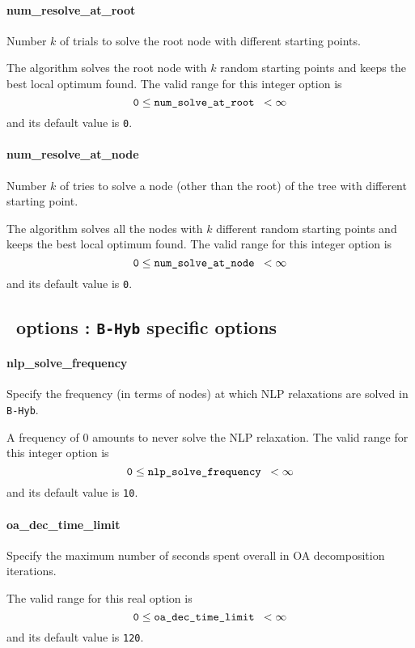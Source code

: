 \paragraph{num\_resolve\_at\_root}
Number $k$ of trials to solve the root node with different starting points.

 The algorithm solves the root node with $k$
random starting points and keeps the best
local optimum found. The valid range for this integer option is
$${\tt 0} \le \hbox{\tt num\_solve\_at\_root } <  \infty $$
and its default value is {\tt 0}.


\paragraph{num\_resolve\_at\_node}
Number $k$ of tries to solve a node (other than the root) of the tree with different starting point.

 The algorithm solves all the nodes with $k$
different random starting points and keeps
the best local optimum found. The valid range for this integer option is
$${\tt 0} \le \hbox{\tt num\_solve\_at\_node } <  \infty$$
and its default value is {\tt 0}.



\subsection{\Bonmin\ options : {\tt B-Hyb} specific options}

\paragraph{nlp\_solve\_frequency}
Specify the frequency (in terms of nodes) at which NLP relaxations
are solved in {\tt B-Hyb}.

 A frequency of 0 amounts to never solve the
NLP relaxation. The valid range for this integer option is
$${\tt 0} \le \hbox{\tt nlp\_solve\_frequency } <  \infty$$
and its default value is {\tt 10}.


\paragraph{oa\_dec\_time\_limit}
Specify the maximum number of seconds spent overall in OA decomposition iterations.

 The valid range for this real option is
$${\tt 0} \le \hbox{\tt oa\_dec\_time\_limit } <  \infty$$
and its default value is {\tt 120}.

